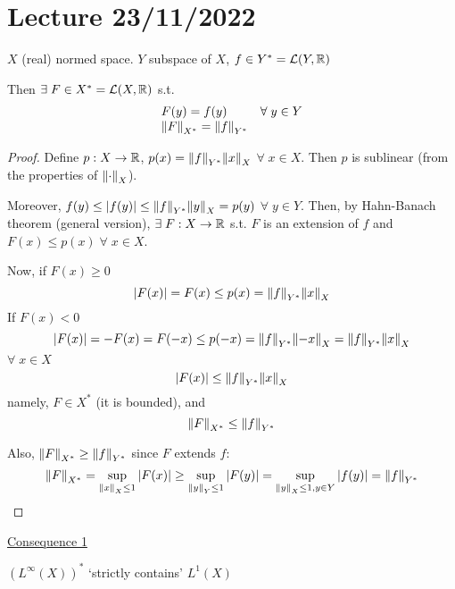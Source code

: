 \section{Lecture 23/11/2022}

\begin{theorem}
    \(X\) (real) normed space. \(Y\) subspace of \(X\), \(f \in Y^* = \mathcal{L}(Y, \mathbb{R})\)

    Then \(\exists \; F \in X^* = \mathcal{L}(X, \mathbb{R})\) s.t. 
    \[
        \begin{array}{lr}
            
            F(y) = f(y) & \forall \; y \in Y \\

            \norm{F}_{X^*} = \norm{f}_{Y^*}   & \\
        \end{array}
    \]
\end{theorem}
\begin{proof}
    Define \(p:X \to \mathbb{R}\), \(p(x) = \norm{f}_{Y^*} \norm{x}_X\) \(\forall \; x \in X\). Then \(p\) is sublinear (from the properties of \(\norm{\cdot}_X\)).

    Moreover, \(f(y) \leq \abs{f(y)} \leq \norm{f}_{Y^*}\norm{y}_X = p(y)\) \(\forall \; y \in Y\). Then, by Hahn-Banach theorem (general version), \(\exists \; F : X \to \mathbb{R}\) s.t. \(F\) is an extension of \(f\) and \(F(x) \leq p(x) \; \forall \; x \in X\).

    Now, if \(F(x) \geq 0\)
    \[
        \abs{F(x)} = F(x) \leq p(x) = \norm{f}_{Y^*}\norm{x}_X
    \]
    If \(F(x) < 0\)
    \[
        \abs{F(x)} = -F(x) = F(-x) \leq p(-x) = \norm{f}_{Y^*}\norm{-x}_X = \norm{f}_{Y^*}\norm{x}_X
    \]
    \(\forall \; x \in X\)
    \[
        \abs{F(x)} \leq \norm{f}_{Y^*}\norm{x}_X
    \]
    namely, \(F \in X^*\) (it is bounded), and 
    \[
        \norm{F}_{X^*} \leq \norm{f}_{Y^*}
    \]

    Also, \(\norm{F}_{X^*} \geq \norm{f}_{Y^*}\) since \(F\) extends \(f\):
    \[
        \norm{F}_{X^*} = \sup_{\norm{x}_X \leq 1} \abs{F(x)} \geq \sup_{\norm{y}_Y \leq 1}\abs{F(y)} 
        = \sup_{\norm{y}_X \leq 1, y \in Y} \abs{f(y)} = \norm{f}_{Y^*}
    \]
\end{proof}
\underline{Consequence 1}
\begin{theorem}
    \((L^\infty (X))^*\) `strictly contains' \(L^1(X)\)
\end{theorem}

